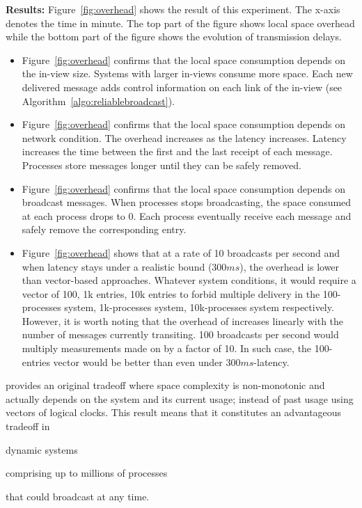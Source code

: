 \noindent \textbf{Results:} Figure~\ref{fig:overhead} shows the result of this
experiment. The x-axis denotes the time in minute. The top part of the figure
shows local space overhead while the bottom part of the figure shows the
evolution of transmission delays. 

\begin{itemize}
\item Figure~\ref{fig:overhead} confirms that the local space consumption
  depends on the in-view size. Systems with larger in-views consume more
  space. Each new delivered message adds control information on each link of the
  in-view (see Algorithm~\ref{algo:reliablebroadcast}).
\item Figure~\ref{fig:overhead} confirms that the local space consumption
  depends on network condition. The overhead increases as the latency
  increases. Latency increases the time between the first and the last receipt
  of each message. Processes store messages longer until they can be safely
  removed. 
\item Figure~\ref{fig:overhead} confirms that the local space consumption
  depends on broadcast messages. When processes stops broadcasting, the space
  consumed at each process drops to 0. Each process eventually receive each
  message and safely remove the corresponding entry.
\item Figure~\ref{fig:overhead} shows that at a rate of 10 broadcasts per second
  and when latency stays under a realistic bound ($300ms$), the overhead is
  lower than vector-based approaches. Whatever system conditions, it would
  require a vector of 100, 1k entries, 10k entries to forbid multiple delivery
  in the 100-processes system, 1k-processes system, 10k-processes system
  respectively. However, it is worth noting that the overhead of \RPCBROADCAST
  increases linearly with the number of messages currently transiting. 100
  broadcasts per second would multiply measurements made on \RPCBROADCAST by a
  factor of 10. In such case, the 100-entries vector would be better than
  \RPCBROADCAST even under $300ms$-latency. 
\end{itemize}

\noindent \RPCBROADCAST provides an original tradeoff where space complexity is
non-monotonic and actually depends on the system and its current usage; instead
of past usage using vectors of logical clocks. This result means that it
constitutes an advantageous tradeoff in
\begin{inparaenum}[(i)]
\item dynamic systems
\item comprising up to millions of processes
\item that could broadcast at any time.
\end{inparaenum} \\

